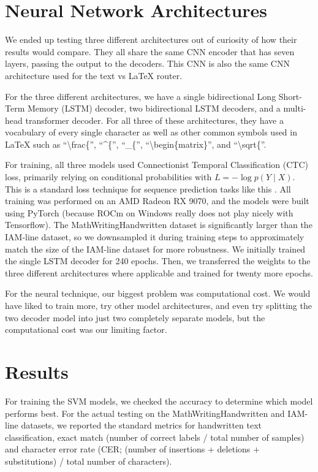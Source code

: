 \documentclass[11pt]{article}
\begin{document}
\section{Neural Network Architectures}

We ended up testing three different architectures out of curiosity of how their results would compare. They all share the same CNN encoder that has seven layers, passing the output to the decoders. This CNN is also the same CNN architecture used for the text vs LaTeX router.

For the three different architectures, we have a single bidirectional Long Short-Term Memory (LSTM) decoder, two bidirectional LSTM decoders, and a multi-head transformer decoder. For all three of these architectures, they have a vocabulary of every single character as well as other common symbols used in LaTeX such as ``\textbackslash frac\{'', ``\textasciicircum\{'', ``\_\{'', ``\textbackslash begin\{matrix\}'', and ``\textbackslash sqrt\{''.

For training, all three models used Connectionist Temporal Classification (CTC) loss, primarily relying on conditional probabilities with $L = -\log p(Y\mid X)$. This is a standard loss technique for sequence prediction tasks like this \citep{hannun2017sequence}. All training was performed on an AMD Radeon RX 9070, and the models were built using PyTorch (because ROCm on Windows really does not play nicely with Tensorflow). The MathWritingHandwritten dataset is significantly larger than the IAM-line dataset, so we downsampled it during training steps to approximately match the size of the IAM-line dataset for more robustness. We initially trained the single LSTM decoder for 240 epochs. Then, we transferred the weights to the three different architectures where applicable and trained for twenty more epochs.

For the neural technique, our biggest problem was computational cost. We would have liked to train more, try other model architectures, and even try splitting the two decoder model into just two completely separate models, but the computational cost was our limiting factor.

\section{Results}

For training the SVM models, we checked the accuracy to determine which model performs best. For the actual testing on the MathWritingHandwritten and IAM-line datasets, we reported the standard metrics for handwritten text classification, exact match (number of correct labels / total number of samples) and character error rate (CER; (number of insertions + deletions + substitutions) / total number of characters).
\end{document}
